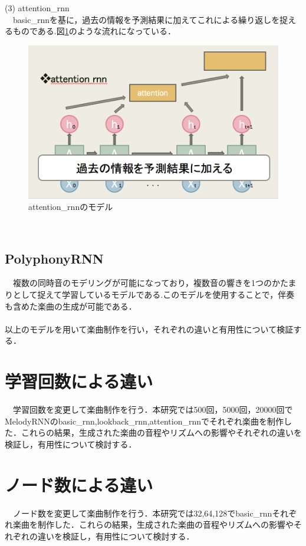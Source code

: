 \newpage
(3) attention\_rnn\\
　basic\_rnnを基に，過去の情報を予測結果に加えてこれによる繰り返しを捉えるものである.図\ref{fig:attentio_rnnのモデル}のような流れになっている．
\begin{figure}[!ht]
    \begin{screen}
    \begin{center}
        \includegraphics[scale=0.8,clip]{./img/attention1.png}
        \caption{attention\_rnnのモデル}
        \label{fig:attentio_rnnのモデル}
    \end{center}
    \end{screen}
\end{figure}\\
\subsection{PolyphonyRNN}
　複数の同時音のモデリングが可能になっており，複数音の響きを1つのかたまりとして捉えて学習しているモデルである.このモデルを使用することで，伴奏も含めた楽曲の生成が可能である．\\
\\
以上のモデルを用いて楽曲制作を行い，それぞれの違いと有用性について検証する．
\newpage
\section{学習回数による違い}
　学習回数を変更して楽曲制作を行う．本研究では500回，5000回，20000回でMelodyRNNのbasic\_rnn,lookback\_rnn,attention\_rnnでそれぞれ楽曲を制作した．これらの結果，生成された楽曲の音程やリズムへの影響やそれぞれの違いを検証し，有用性について検討する．
\section{ノード数による違い}
　ノード数を変更して楽曲制作を行う．本研究では32,64,128でbasic\_rnnそれぞれ楽曲を制作した．これらの結果，生成された楽曲の音程やリズムへの影響やそれぞれの違いを検証し，有用性について検討する．